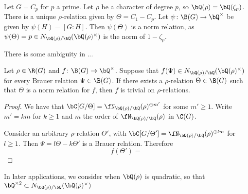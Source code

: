 
\begin{example}
    Let $G = C_p$ for $p$ a prime. Let $\rho$ be a character of degree $p$, so $\bQ(\rho) = \bQ(\zeta_p)$. There is a unique $\rho$-relation given by $\Theta = C_1 - C_p$. Let $\psi \colon \B(G) \to \bQ^{\times}$ be given by $\psi(H) = [G : H]$. Then $\psi(\Theta)$ is a norm relation, as $\psi(\Theta) = p \in \fieldnorm{\rho}$ is the norm of $1 - \zeta_p$.
\end{example}

There is some ambiguity in ... 

\begin{prop}
    Let $\rho \in \R(G)$ and $f \colon \B(G) \to \bQ^{\times}$. Suppose that $f(\Psi) \in \fieldnorm{\rho}$ for every Brauer relation $\Psi \in \B(G)$. If there exists a $\rho$-relation $\Theta \in \B(G)$ such that $\Theta$ is a norm relation for $f$, then $f$ is trivial on $\rho$-relations. 
\end{prop}

\begin{proof}
    We have that $\bC[G / \Theta ] = \repnorm{\rho}^{\oplus m'}$ for some $m' \geq 1$. Write $m' = k m $ for $k \geq 1$ and $m$ the order of $\repnorm{\rho}$ in $\C(G)$. 

    Consider an arbitrary $\rho$-relation $\Theta'$, with $\bC[G / \Theta' ] = \repnorm{\rho}^{\oplus l m}$ for $l \geq 1$. Then $\Psi = l\Theta - k\Theta'$ is a Brauer relation. Therefore
    \[ f(\Theta') = \]
\end{proof}

In later applications, we consider when $\bQ(\rho)$ is quadratic, so that $\bQ^{\times 2} \subset \fieldnorm{\rho}$



